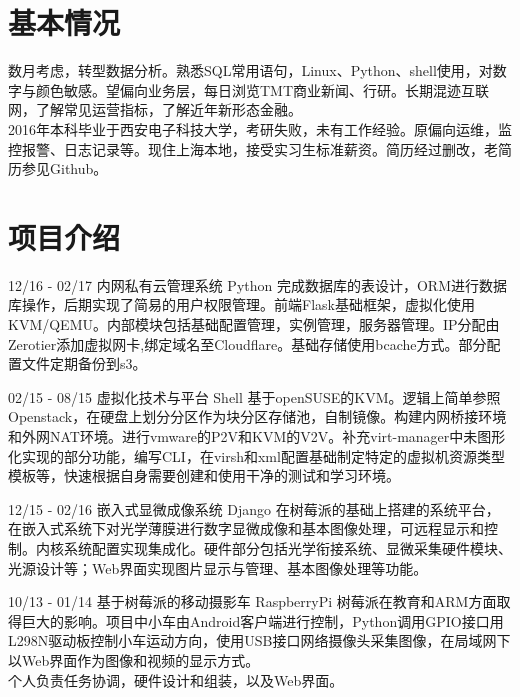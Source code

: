 \documentclass[]{friggeri-cv}
\begin{document}
\section{基本情况}
数月考虑，转型数据分析。熟悉SQL常用语句，Linux、Python、shell使用，对数字与颜色敏感。望偏向业务层，每日浏览TMT商业新闻、行研。长期混迹互联网，了解常见运营指标，了解近年新形态金融。\\
2016年本科毕业于西安电子科技大学，考研失败，未有工作经验。原偏向运维，监控报警、日志记录等。现住上海本地，接受实习生标准薪资。简历经过删改，老简历参见Github。


\section{项目介绍}
\begin{entrylist}
  \entry
    {12/16 - 02/17}
    {内网私有云管理系统}
    {Python}
    { 完成数据库的表设计，ORM进行数据库操作，后期实现了简易的用户权限管理。前端Flask基础框架，虚拟化使用KVM/QEMU。内部模块包括基础配置管理，实例管理，服务器管理。IP分配由Zerotier添加虚拟网卡,绑定域名至Cloudflare。基础存储使用bcache方式。部分配置文件定期备份到s3。
    \\}


  \entry
    {02/15 - 08/15 }
    {虚拟化技术与平台}
    {Shell}
    {基于openSUSE的KVM。逻辑上简单参照Openstack，在硬盘上划分分区作为块分区存储池，自制镜像。构建内网桥接环境和外网NAT环境。进行vmware的P2V和KVM的V2V。补充virt-manager中未图形化实现的部分功能，编写CLI，在virsh和xml配置基础制定特定的虚拟机资源类型模板等，快速根据自身需要创建和使用干净的测试和学习环境。\\}   

  \entry
    {12/15 - 02/16}
    {嵌入式显微成像系统}
    {Django}
    {在树莓派的基础上搭建的系统平台，在嵌入式系统下对光学薄膜进行数字显微成像和基本图像处理，可远程显示和控制。内核系统配置实现集成化。硬件部分包括光学衔接系统、显微采集硬件模块、光源设计等；Web界面实现图片显示与管理、基本图像处理等功能。
   \\ }%

   \entry
   {10/13 - 01/14}
   {基于树莓派的移动摄影车}
   {RaspberryPi}
   {
    树莓派在教育和ARM方面取得巨大的影响。项目中小车由Android客户端进行控制，Python调用GPIO接口用L298N驱动板控制小车运动方向，使用USB接口网络摄像头采集图像，在局域网下以Web界面作为图像和视频的显示方式。\\
    个人负责任务协调，硬件设计和组装，以及Web界面。\\
   }


\end{entrylist}
\end{document}
